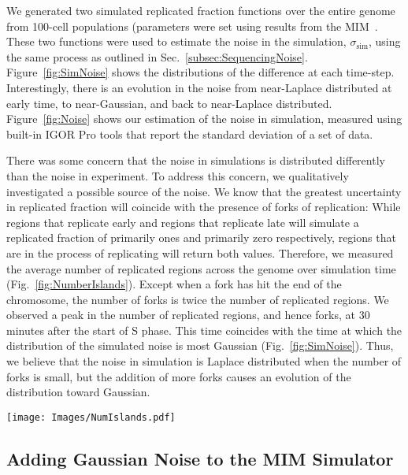 		We generated two simulated replicated fraction functions over the entire genome from 100-cell populations (parameters were set using results from the MIM~\cite{ScottsPaper}.
		These two functions were used to estimate the noise in the simulation, $\sigma_\text{sim}$, using the same process as outlined in Sec.~\ref{subsec:SequencingNoise}.
		Figure~\ref{fig:SimNoise} shows the distributions of the difference at each time-step.
		Interestingly, there is an evolution in the noise from near-Laplace distributed at early time, to near-Gaussian, and back to near-Laplace distributed.
		Figure~\ref{fig:Noise} shows our estimation of the noise in simulation, measured using built-in IGOR Pro tools that report the standard deviation of a set of data.
		
		There was some concern that the noise in simulations is distributed differently than the noise in experiment.
		To address this concern, we qualitatively investigated a possible source of the noise.
		We know that the greatest uncertainty in replicated fraction will coincide with the presence of forks of replication:
		While regions that replicate early and regions that replicate late will simulate a replicated fraction of primarily ones and primarily zero respectively, regions that are in the process of replicating will return both values.
		Therefore, we measured  the average number of replicated regions across the genome over simulation time (Fig.~\ref{fig:NumberIslands}).
		Except when a fork has hit the end of the chromosome, the number of forks is twice the number of replicated regions.
		We observed a peak in the number of replicated regions, and hence forks, at 30 minutes after the start of S phase.
		This time coincides with the time at which the distribution of the simulated noise is most Gaussian (Fig.~\ref{fig:SimNoise}).
		Thus, we believe that the noise in simulation is Laplace distributed when the number of forks is small, but the addition of more forks causes an evolution of the distribution toward Gaussian.
		
		\begin{SCfigure}[1][tbh]
			\texttt{[image: Images/NumIslands.pdf]}
			\caption[Number of Replicated Regions in Simulation]{\label{fig:NumberIslands}
				Histogram of the number of replicated region in the simulation, normalized to a single cell.
				x-axis shows $t_\text{sim}$ in minutes.
			}
		\end{SCfigure}
		
		
		\subsection{Adding Gaussian Noise to the MIM Simulator}
		\label{subsec:AddingNoise}
		
